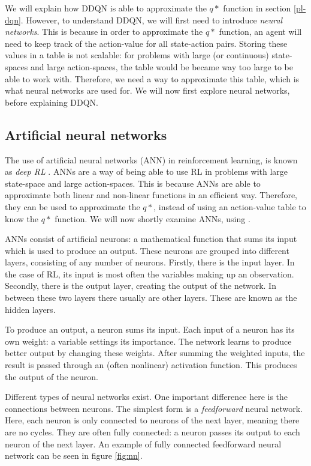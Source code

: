 We will explain how DDQN is able to approximate the $q*$ function in section \ref{pl-dqn}. However, to understand DDQN, we will first need to introduce \emph{neural networks}. This is because in order to approximate the $q*$ function, an agent will need to keep track of the action-value for all state-action pairs. Storing these values in a table is not scalable: for problems with large (or continuous) state-spaces and large action-spaces, the table would be became way too large to be able to work with. Therefore, we need a way to approximate this table, which is what neural networks are used for. We will now first explore neural networks, before explaining DDQN.

\subsection{Artificial neural networks}
The use of artificial neural networks (ANN) in reinforcement learning, is known as \emph{deep RL} \cite[p. 5]{grokking}. ANNs are a way of being able to use RL in problems with large state-space and large action-spaces. This is because ANNs are able to approximate both linear and non-linear functions in an efficient way\cite[p. 165-166]{nn}. Therefore, they can be used to approximate the $q*$, instead of using an action-value table to know the $q*$ function. We will now shortly examine ANNs, using \cite[p. 164-366]{nn}.

ANNs consist of artificial neurons: a mathematical function that sums its input which is used to produce an output. These neurons are grouped into different layers, consisting of any number of neurons. Firstly, there is the input layer. In the case of RL, its input is most often the variables making up an observation. Secondly, there is the output layer, creating the output of the network. In between these two layers there usually are other layers. These are known as the hidden layers. 

To produce an output, a neuron sums its input. Each input of a neuron has its own weight: a variable settings its importance. The network learns to produce better output by changing these weights. After summing the weighted inputs, the result is passed through an (often nonlinear) activation function. This produces the output of the neuron. 

Different types of neural networks exist. One important difference here is the connections between neurons. The simplest form is a \emph{feedforward} neural network. Here, each neuron is only connected to neurons of the next layer, meaning there are no cycles. They are often fully connected: a neuron passes its output to each neuron of the next layer. An example of fully connected feedforward neural network can be seen in figure \ref{fig:nn}.

